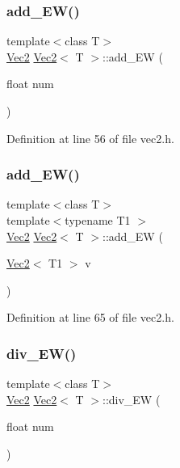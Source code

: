 \subsubsection{\texorpdfstring{add\_EW()}{add\_EW()}\hspace{0.1cm}{\footnotesize\ttfamily [1/2]}}
{\footnotesize\ttfamily template$<$class T$>$ \\
\mbox{\hyperlink{class_vec2}{Vec2}} \mbox{\hyperlink{class_vec2}{Vec2}}$<$ T $>$\+::add\+\_\+\+EW (\begin{DoxyParamCaption}\item[{float}]{num }\end{DoxyParamCaption})\hspace{0.3cm}{\ttfamily [inline]}}



Definition at line 56 of file vec2.\+h.

\mbox{\label{class_vec2_a5cb06b33f0fcdedec1307eed8f406e29}} 
\subsubsection{\texorpdfstring{add\_EW()}{add\_EW()}\hspace{0.1cm}{\footnotesize\ttfamily [2/2]}}
{\footnotesize\ttfamily template$<$class T$>$ \\
template$<$typename T1 $>$ \\
\mbox{\hyperlink{class_vec2}{Vec2}} \mbox{\hyperlink{class_vec2}{Vec2}}$<$ T $>$\+::add\+\_\+\+EW (\begin{DoxyParamCaption}\item[{\mbox{\hyperlink{class_vec2}{Vec2}}$<$ T1 $>$}]{v }\end{DoxyParamCaption})\hspace{0.3cm}{\ttfamily [inline]}}



Definition at line 65 of file vec2.\+h.

\mbox{\label{class_vec2_ae4c8c7185940d5d3a951aad9114477a5}} 
\subsubsection{\texorpdfstring{div\_EW()}{div\_EW()}\hspace{0.1cm}{\footnotesize\ttfamily [1/2]}}
{\footnotesize\ttfamily template$<$class T$>$ \\
\mbox{\hyperlink{class_vec2}{Vec2}} \mbox{\hyperlink{class_vec2}{Vec2}}$<$ T $>$\+::div\+\_\+\+EW (\begin{DoxyParamCaption}\item[{float}]{num }\end{DoxyParamCaption})\hspace{0.3cm}{\ttfamily [inline]}}



